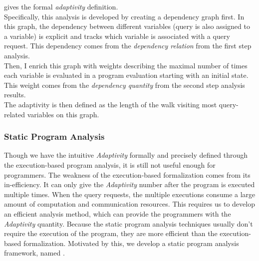 \begin{enumerate}
 gives the formal \emph{adaptivity} definition. 
 \\
 Specifically, this analysis is developed by creating a dependency graph first. 
 In this graph, the dependency between different variables (query is also assigned to a variable) 
 is explicit and tracks which variable is associated with a query request. 
 This dependency comes from the \emph{dependency relation} from the first step analysis.
 \\
 Then, I enrich this graph with 
 weights describing the maximal number of times each variable is evaluated in a program evaluation starting with an initial state. 
 This weight comes from the \emph{dependency quantity} from the second step analysis results.
 \\
 The adaptivity is then defined as the length of the walk visiting most query-related variables on this graph. 
 \end{enumerate}
\subsubsection{Static Program Analysis}
\label{sec:adapt-intro-static}
%
Though we have the intuitive \emph{Adaptivity} formally and precisely defined through the execution-based program analysis,
it is still not useful enough for programmers.
The weakness of the execution-based formalization comes from its in-efficiency.
It can only give the \emph{Adaptivity} number
after the program is executed multiple times.
When the query requests, the multiple executions consume a large amount of computation and communication resources.
This requires us to develop an efficient analysis method, 
which can provide the programmers with the \emph{Adaptivity} quantity.
Because the static program analysis techniques usually don't require the execution of the program,
they are more efficient than the execution-based formalization.
Motivated by this, we develop a static program analysis framework, named {\THESYSTEM}.
